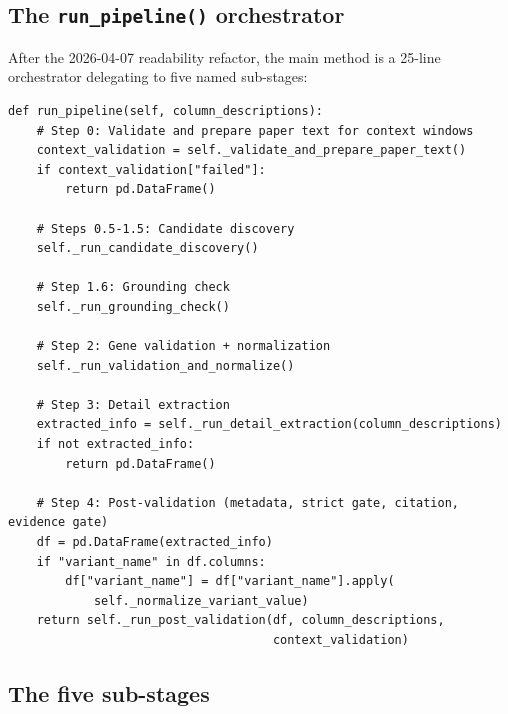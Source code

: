 \documentclass[11pt,a4paper]{article}
\newcommand{\codefile}[1]{\texttt{\small\color{gray}#1}}
\begin{document}
\subsection{The \texttt{run\_pipeline()} orchestrator}

After the 2026-04-07 readability refactor, the main method is a 25-line orchestrator delegating to five named sub-stages:

\begin{lstlisting}[style=python,caption={\codefile{gemini\_extractor.py:1318--1356} --- post-refactor orchestrator}]
def run_pipeline(self, column_descriptions):
    # Step 0: Validate and prepare paper text for context windows
    context_validation = self._validate_and_prepare_paper_text()
    if context_validation["failed"]:
        return pd.DataFrame()

    # Steps 0.5-1.5: Candidate discovery
    self._run_candidate_discovery()

    # Step 1.6: Grounding check
    self._run_grounding_check()

    # Step 2: Gene validation + normalization
    self._run_validation_and_normalize()

    # Step 3: Detail extraction
    extracted_info = self._run_detail_extraction(column_descriptions)
    if not extracted_info:
        return pd.DataFrame()

    # Step 4: Post-validation (metadata, strict gate, citation, evidence gate)
    df = pd.DataFrame(extracted_info)
    if "variant_name" in df.columns:
        df["variant_name"] = df["variant_name"].apply(
            self._normalize_variant_value)
    return self._run_post_validation(df, column_descriptions,
                                     context_validation)
\end{lstlisting}

\subsection{The five sub-stages}
\end{document}
